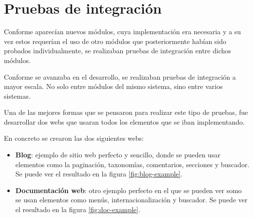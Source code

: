 % 
% 

\section{Pruebas de integración}

Conforme aparecían nuevos módulos, cuya implementación era necesaria y a su vez estos requerían el uso de otro módulos que
posteriormente habían sido probados individualmente, se realizaban pruebas de integración entre dichos módulos.

Conforme se avanzaba en el desarrollo, se realizaban pruebas de integración a mayor escala. No solo entre módulos
del mismo sistema, sino entre varios sistemas.

Una de las mejores formas que se pensaron para realizar este tipo de pruebas, fue desarrollar dos webs que usaran todos 
los elementos que se iban implementando.

En concreto se crearon las dos siguientes webs:

\begin{itemize}
    \item \textbf{Blog}: ejemplo de sitio web perfecto y sencillo, donde se pueden usar elementos como la paginación,
        taxonomías, comentarios, secciones y buscador. Se puede ver el resultado en la figura \ref{fig:blog-example}.
    \item \textbf{Documentación web}: otro ejemplo perfecto en el que se pueden ver somo se usan elementos como menús,
        internacionalización y buscador. Se puede ver el resultado en la figura \ref{fig:doc-example}.
\end{itemize}

